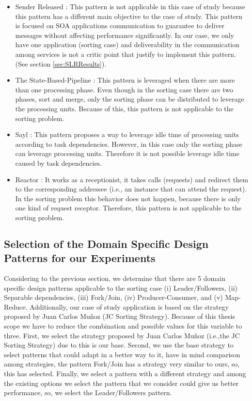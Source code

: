 \begin{itemize}
	\item Sender Released : This pattern is not applicable in this case of study because this pattern has a different main objective to the case of study. This pattern is focused on SOA applications communication to guarantee to deliver messages without affecting performance significantly. In our case, we only have one application (sorting case) and deliverability in the communication among services is not a critic point that justify to implement this pattern. (See section \ref{sec:SLRResults}).
	
	\item The State-Based-Pipeline : This pattern is leveraged when there are more than one processing phase. Even though in the sorting case there are two phases, sort and merge, only the sorting phase can be distributed to leverage the processing units. Because of this, this pattern is not applicable to the sorting problem.
	
	\item Sayl : This pattern proposes a way to leverage idle time of processing units according to task dependencies. However, in this case only the sorting phase can leverage processing units. Therefore it is not possible leverage idle time caused by task dependencies.
	
	\item Reactor : It works as a receptionist, it takes calls (requests) and redirect them to the corresponding addressee (i.e., an instance that can attend the request). In the sorting problem this behavior does not happen, because there is only one kind of request receptor. Therefore, this pattern is not applicable to the sorting problem. 
	
\end{itemize}

\subsection{Selection of the Domain Specific Design Patterns for our Experiments}

Considering to the previous section, we determine that there are 5 domain specific design patterns applicable to the sorting case (i) Leader/Followers, (ii) Separable dependencies, (iii) Fork/Join, (iv) Producer-Consumer, and (v) Map-Reduce. Additionally, our case of study application is based on the strategy proposed by Juan Carlos Mu\~{n}oz (JC Sorting Strategy). Because of this thesis scope we have to reduce the combination and possible values for this variable to three. First, we select the strategy proposed by Juan Carlos Mu\~{n}oz (i.e.,the JC Sorting Strategy) due to this is our base. Second, we use the base strategy to select patterns that could adapt in a better way to it, have in mind comparison among strategies, the pattern Fork/Join has a strategy very similar to ours, so, this has selected. Finally, we select a pattern with a different strategy and among the existing options we select the pattern that we consider could give us better performance, so, we select the Leader/Followers pattern.

